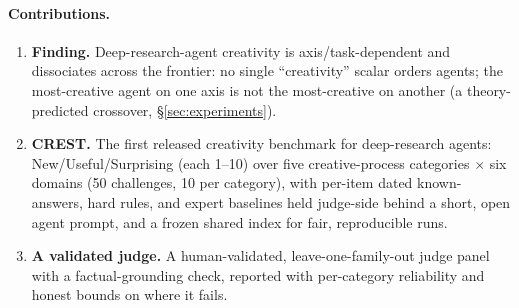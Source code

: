 \paragraph{Contributions.}
\begin{enumerate}
  \item \textbf{Finding.} Deep-research-agent creativity is axis/task-dependent and dissociates across the frontier: no single ``creativity'' scalar orders agents; the most-creative agent on one axis is not the most-creative on another (a theory-predicted crossover, \S\ref{sec:experiments}).
  \item \textbf{CREST.} The first released creativity benchmark for deep-research agents: New/Useful/Surprising (each 1--10) over five creative-process categories $\times$ six domains (50 challenges, 10 per category), with per-item dated known-answers, hard rules, and expert baselines held judge-side behind a short, open agent prompt, and a frozen shared index for fair, reproducible runs.
  \item \textbf{A validated judge.} A human-validated, leave-one-family-out judge panel with a factual-grounding check, reported with per-category reliability and honest bounds on where it fails.
\end{enumerate}
